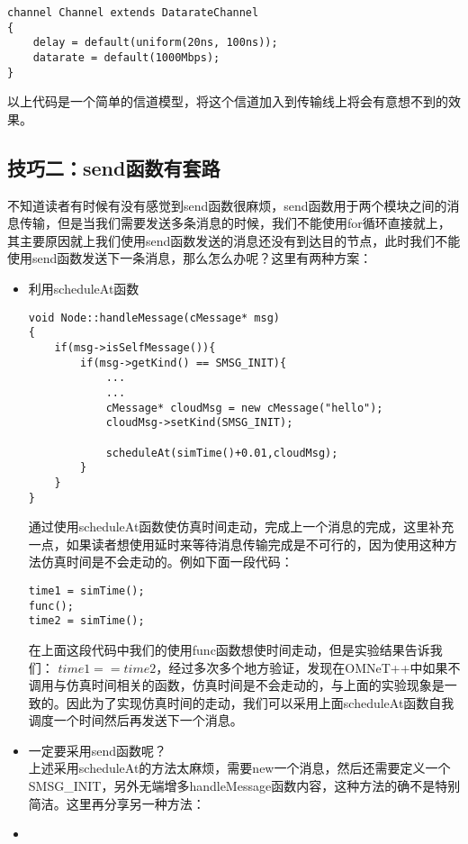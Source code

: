 \begin{lstlisting}
channel Channel extends DatarateChannel
{
	delay = default(uniform(20ns, 100ns));
	datarate = default(1000Mbps);
}
\end{lstlisting}

以上代码是一个简单的信道模型，将这个信道加入到传输线上将会有意想不到的效果。\\

\subsection{技巧二：send函数有套路}
不知道读者有时候有没有感觉到send函数很麻烦，send函数用于两个模块之间的消息传输，但是当我们需要发送多条消息的时候，我们不能使用for循环直接就上，其主要原因就上我们使用send函数发送的消息还没有到达目的节点，此时我们不能使用send函数发送下一条消息，那么怎么办呢？这里有两种方案：

\begin{itemize}
	\item 利用scheduleAt函数
	
\begin{lstlisting}
void Node::handleMessage(cMessage* msg)
{
	if(msg->isSelfMessage()){
		if(msg->getKind() == SMSG_INIT){
			...
			...
			cMessage* cloudMsg = new cMessage("hello");
			cloudMsg->setKind(SMSG_INIT);
			
			scheduleAt(simTime()+0.01,cloudMsg);
		}
	}
}
\end{lstlisting}
	
通过使用scheduleAt函数使仿真时间走动，完成上一个消息的完成，这里补充一点，如果读者想使用延时来等待消息传输完成是不可行的，因为使用这种方法仿真时间是不会走动的。例如下面一段代码：

\begin{lstlisting}
time1 = simTime();
func();
time2 = simTime();
\end{lstlisting}
在上面这段代码中我们的使用func函数想使时间走动，但是实验结果告诉我们：
$time1==time2$，经过多次多个地方验证，发现在OMNeT++中如果不调用与仿真时间相关的函数，仿真时间是不会走动的，与上面的实验现象是一致的。因此为了实现仿真时间的走动，我们可以采用上面scheduleAt函数自我调度一个时间然后再发送下一个消息。
	\item 一定要采用send函数呢？\\
上述采用scheduleAt的方法太麻烦，需要new一个消息，然后还需要定义一个SMSG\_INIT，另外无端增多handleMessage函数内容，这种方法的确不是特别简洁。这里再分享另一种方法：	
	
	
	
	\item
	
\end{itemize}




